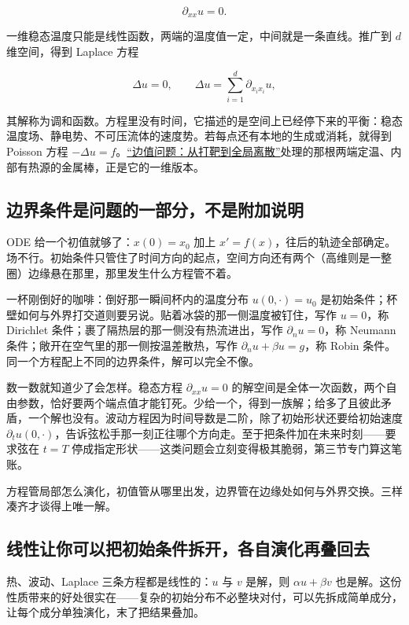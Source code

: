 \[
\partial_{xx}u=0 .
\]

一维稳态温度只能是线性函数，两端的温度值一定，中间就是一条直线。推广到 \(d\) 维空间，得到 Laplace 方程

\[
\Delta u=0,
\qquad
\Delta u=\sum_{i=1}^{d}\partial_{x_ix_i}u ,
\]

其解称为调和函数。方程里没有时间，它描述的是空间上已经停下来的平衡：稳态温度场、静电势、不可压流体的速度势。若每点还有本地的生成或消耗，就得到 Poisson 方程 \(-\Delta u=f\)。\hyperref[sec:08-Numerical-Analysis/06-ODE/04]{``边值问题：从打靶到全局离散''}处理的那根两端定温、内部有热源的金属棒，正是它的一维版本。

\subsection{边界条件是问题的一部分，不是附加说明}

ODE 给一个初值就够了：\(x(0)=x_0\) 加上 \(x'=f(x)\)，往后的轨迹全部确定。场不行。初始条件只管住了时间方向的起点，空间方向还有两个（高维则是一整圈）边缘悬在那里，那里发生什么方程管不着。

一杯刚倒好的咖啡：倒好那一瞬间杯内的温度分布 \(u(0,\cdot)=u_0\) 是初始条件；杯壁如何与外界打交道则要另说。贴着冰袋的那一侧温度被钉住，写作 \(u=0\)，称 Dirichlet 条件；裹了隔热层的那一侧没有热流进出，写作 \(\partial_nu=0\)，称 Neumann 条件；敞开在空气里的那一侧按温差散热，写作 \(\partial_nu+\beta u=g\)，称 Robin 条件。同一个方程配上不同的边界条件，解可以完全不像。

数一数就知道少了会怎样。稳态方程 \(\partial_{xx}u=0\) 的解空间是全体一次函数，两个自由参数，恰好要两个端点值才能钉死。少给一个，得到一族解；给多了且彼此矛盾，一个解也没有。波动方程因为时间导数是二阶，除了初始形状还要给初始速度 \(\partial_tu(0,\cdot)\)，告诉弦松手那一刻正往哪个方向走。至于把条件加在未来时刻——要求弦在 \(t=T\) 停成指定形状——这类问题会立刻变得极其脆弱，第三节专门算这笔账。

方程管局部怎么演化，初值管从哪里出发，边界管在边缘处如何与外界交换。三样凑齐才谈得上唯一解。

\subsection{线性让你可以把初始条件拆开，各自演化再叠回去}

热、波动、Laplace 三条方程都是线性的：\(u\) 与 \(v\) 是解，则 \(\alpha u+\beta v\) 也是解。这份性质带来的好处很实在——复杂的初始分布不必整块对付，可以先拆成简单成分，让每个成分单独演化，末了把结果叠加。

